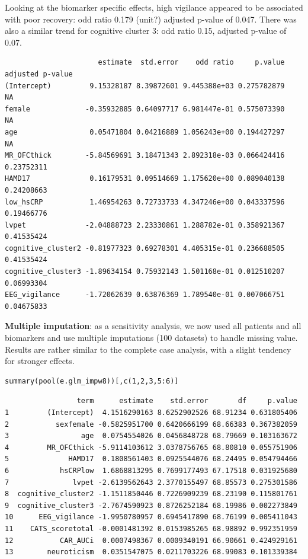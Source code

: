 \documentclass[12pt]{article}
\begin{document}
Looking at the biomarker specific effects, high vigilance appeared to
be associated with poor recovery: odd ratio 0.179 (unit?) adjusted
p-value of 0.047. There was also a similar trend for cognitive cluster
3: odd ratio 0.15, adjusted p-value of 0.07.
\begin{verbatim}
                      estimate  std.error    odd ratio     p.value adjusted p-value
(Intercept)         9.15328187 8.39872601 9.445388e+03 0.275782879               NA
female             -0.35932885 0.64097717 6.981447e-01 0.575073390               NA
age                 0.05471804 0.04216889 1.056243e+00 0.194427297               NA
MR_OFCthick        -5.84569691 3.18471343 2.892318e-03 0.066424416       0.23752311
HAMD17              0.16179531 0.09514669 1.175620e+00 0.089040138       0.24208663
low_hsCRP           1.46954263 0.72733733 4.347246e+00 0.043337596       0.19466776
lvpet              -2.04888723 2.23330861 1.288782e-01 0.358921367       0.41535424
cognitive_cluster2 -0.81977323 0.69278301 4.405315e-01 0.236688505       0.41535424
cognitive_cluster3 -1.89634154 0.75932143 1.501168e-01 0.012510207       0.06993304
EEG_vigilance      -1.72062639 0.63876369 1.789540e-01 0.007066751       0.04675833
\end{verbatim}

\textbf{Multiple imputation}: as a sensitivity analysis, we now used all
patients and all biomarkers and use multiple imputations (100
datasets) to handle missing value. Results are rather similar to the
complete case analysis, with a slight tendency for stronger effects.
\lstset{language=r,label= ,caption= ,captionpos=b,numbers=none}
\begin{lstlisting}
summary(pool(e.glm_impw8))[,c(1,2,3,5:6)]
\end{lstlisting}

\begin{verbatim}
                 term      estimate    std.error       df     p.value
1         (Intercept)  4.1516290163 8.6252902526 68.91234 0.631805406
2           sexfemale -0.5825951700 0.6420666199 68.66383 0.367382059
3                 age  0.0754554026 0.0456848728 68.79669 0.103163672
4         MR_OFCthick -5.9114103612 3.0378756765 68.80810 0.055751906
5              HAMD17  0.1808561403 0.0925544076 68.24495 0.054794466
6            hsCRPlow  1.6868813295 0.7699177493 67.17518 0.031925680
7               lvpet -2.6139562643 2.3770155497 68.85573 0.275301586
8  cognitive_cluster2 -1.1511850446 0.7226909239 68.23190 0.115801761
9  cognitive_cluster3 -2.7674590923 0.8726252184 68.19986 0.002273849
10      EEG_vigilance -1.9950780957 0.6945417890 68.76199 0.005411043
11    CATS_scoretotal -0.0001481392 0.0153985265 68.98892 0.992351959
12           CAR_AUCi  0.0007498367 0.0009340191 66.90661 0.424929161
13        neuroticism  0.0351547075 0.0211703226 68.99083 0.101339384
\end{verbatim}
\end{document}
